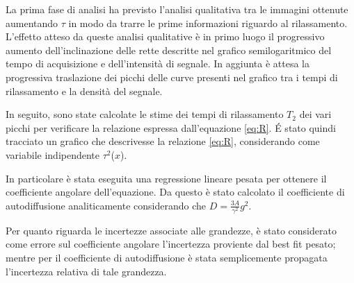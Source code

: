 La prima fase di analisi ha previsto l'analisi qualitativa tra le immagini ottenute aumentando $\tau$ in modo da trarre le prime informazioni riguardo al rilassamento.
L'effetto atteso da queste analisi qualitative è in primo luogo il progressivo aumento dell'inclinazione delle rette descritte nel grafico semilogaritmico del tempo di acquisizione e dell'intensità di segnale.
In aggiunta è attesa la progressiva traslazione dei picchi delle curve presenti nel grafico tra i tempi di rilassamento e la densità del segnale.

In seguito, sono state calcolate le stime dei tempi di rilassamento $T_2$ dei vari picchi per verificare la relazione espressa dall'equazione \ref{eq:R}. 
\'E stato quindi tracciato un grafico che descrivesse la relazione \ref{eq:R}, considerando come variabile indipendente $\tau^2$($x$). 

In particolare è stata eseguita una regressione lineare pesata per ottenere il coefficiente angolare dell'equazione.
Da questo è stato calcolato il coefficiente di autodiffusione analiticamente considerando che $D=\frac{3A}{{\gamma}^2}g^2$.

Per quanto riguarda le incertezze associate alle grandezze, è stato considerato come errore sul coefficiente angolare l'incertezza proviente dal best fit pesato; mentre per il coefficiente di autodiffusione è stata semplicemente propagata l'incertezza relativa di tale grandezza.


